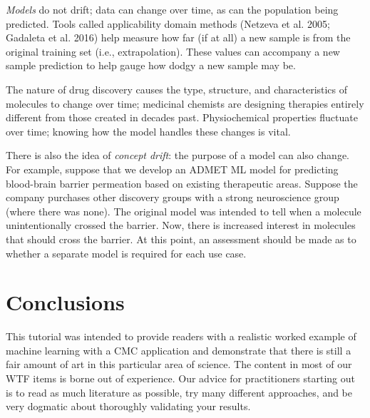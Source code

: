 \documentclass[
  letterpaper,
  DIV=11,
  numbers=noendperiod]{scrartcl}
\begin{document}
\begin{tcolorbox}[enhanced jigsaw, title=\textcolor{quarto-callout-important-color}{\faExclamation}\hspace{0.5em}{\textbf{WTF} \#15}, rightrule=.15mm, leftrule=.75mm, bottomtitle=1mm, opacityback=0, opacitybacktitle=0.6, bottomrule=.15mm, arc=.35mm, colframe=quarto-callout-important-color-frame, breakable, toprule=.15mm, toptitle=1mm, colback=white, titlerule=0mm, coltitle=black, left=2mm, colbacktitle=quarto-callout-important-color!10!white]

\emph{Models} do not drift; data can change over time, as can the
population being predicted. Tools called applicability domain methods
(Netzeva et al. 2005; Gadaleta et al. 2016) help measure how far (if at
all) a new sample is from the original training set (i.e.,
extrapolation). These values can accompany a new sample prediction to
help gauge how dodgy a new sample may be.

\end{tcolorbox}

The nature of drug discovery causes the type, structure, and
characteristics of molecules to change over time; medicinal chemists are
designing therapies entirely different from those created in decades
past. Physiochemical properties fluctuate over time; knowing how the
model handles these changes is vital.

There is also the idea of \emph{concept drift}: the purpose of a model
can also change. For example, suppose that we develop an ADMET ML model
for predicting blood-brain barrier permeation based on existing
therapeutic areas. Suppose the company purchases other discovery groups
with a strong neuroscience group (where there was none). The original
model was intended to tell when a molecule unintentionally crossed the
barrier. Now, there is increased interest in molecules that should cross
the barrier. At this point, an assessment should be made as to whether a
separate model is required for each use case.

\hypertarget{conclusions}{%
\section{Conclusions}\label{conclusions}}

This tutorial was intended to provide readers with a realistic worked
example of machine learning with a CMC application and demonstrate that
there is still a fair amount of art in this particular area of science.
The content in most of our WTF items is borne out of experience. Our
advice for practitioners starting out is to read as much literature as
possible, try many different approaches, and be very dogmatic about
thoroughly validating your results.
\end{document}

